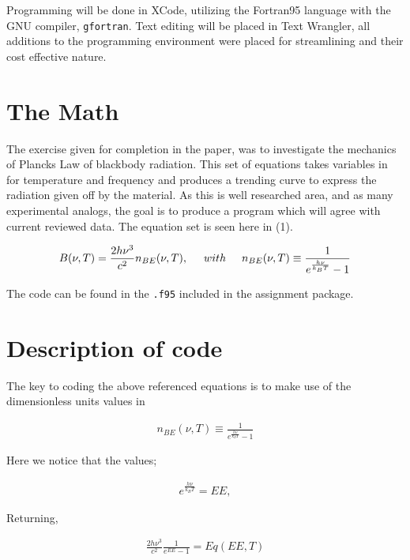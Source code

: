 \documentclass[12pt]{article}
\begin{document}
Programming will be done in XCode, utilizing the Fortran95 language with the GNU compiler, {\tt gfortran}.  
Text editing will be placed in Text Wrangler, all additions to the programming environment were placed for streamlining and their cost effective nature.



\section{The Math}

The exercise given for completion in the paper, was to investigate the  mechanics of Plancks Law of blackbody radiation. This set of equations takes variables in for temperature and frequency and produces a trending curve to express the radiation given off by the material. As this is well researched area, and as many experimental analogs, the goal is to produce a program which will agree with current reviewed data. The equation set is seen here in (1).


\begin{align}
		B(\nu,T)  = \frac{2h\nu^3}{c^2} n_{BE} (\nu,T), \hspace{5mm} with \hspace{5mm}   n_{BE} (\nu, T) \equiv  \frac {1}{e^\frac{h\nu}{k_B T}-1}
\end{align}
 

The code can be found in the {\tt .f95} included in the assignment package.
 
 \section{Description of code}


The key to coding the above referenced equations is to make use of the dimensionless units values in 


\begin{align} 
	n_{BE} (\nu, T) \equiv  \frac {1}{e^\frac{h\nu}{k_B T}-1}
\end{align}



Here we notice that the values; 



\begin{align}
	e^\frac{h\nu}{k_B T}  = EE,
\end{align}

Returning,

\begin{align}
	\frac{2h\nu^3}{c^2} \frac{1}{e^{EE}-1} = Eq(EE,T) 
\end{align} 
\end{document}
